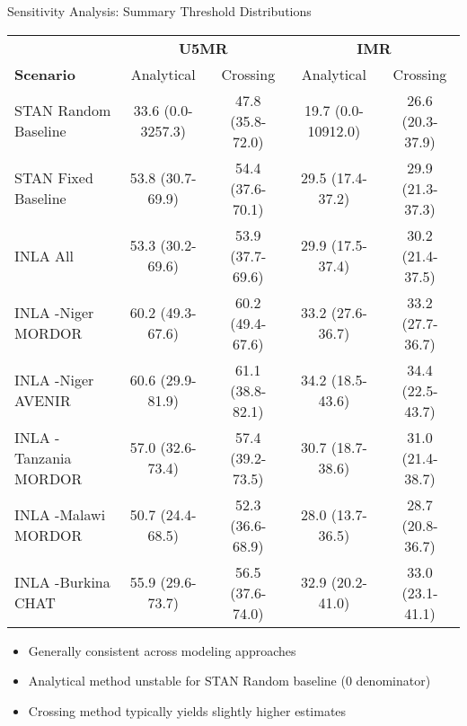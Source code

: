 \documentclass[aspectratio=169]{beamer}\usepackage[]{graphicx}\usepackage[dvipsnames]{xcolor}
\begin{document}
\begin{frame}{Sensitivity Analysis: Summary Threshold Distributions}
\begin{center}\footnotesize\begin{tabular}{l|cc|cc}\toprule& \multicolumn{2}{c}{\textbf{U5MR}} & \multicolumn{2}{c}{\textbf{IMR}} \\\textbf{Scenario} & Analytical & Crossing & Analytical & Crossing \\\midrule STAN Random Baseline & 33.6 (0.0-3257.3) & 47.8 (35.8-72.0) & 19.7 (0.0-10912.0) & 26.6 (20.3-37.9) \\STAN Fixed Baseline & 53.8 (30.7-69.9) & 54.4 (37.6-70.1) & 29.5 (17.4-37.2) & 29.9 (21.3-37.3) \\INLA All & 53.3 (30.2-69.6) & 53.9 (37.7-69.6) & 29.9 (17.5-37.4) & 30.2 (21.4-37.5) \\INLA -Niger MORDOR & 60.2 (49.3-67.6) & 60.2 (49.4-67.6) & 33.2 (27.6-36.7) & 33.2 (27.7-36.7) \\INLA -Niger AVENIR & 60.6 (29.9-81.9) & 61.1 (38.8-82.1) & 34.2 (18.5-43.6) & 34.4 (22.5-43.7) \\INLA -Tanzania MORDOR & 57.0 (32.6-73.4) & 57.4 (39.2-73.5) & 30.7 (18.7-38.6) & 31.0 (21.4-38.7) \\INLA -Malawi MORDOR & 50.7 (24.4-68.5) & 52.3 (36.6-68.9) & 28.0 (13.7-36.5) & 28.7 (20.8-36.7) \\INLA -Burkina CHAT & 55.9 (29.6-73.7) & 56.5 (37.6-74.0) & 32.9 (20.2-41.0) & 33.0 (23.1-41.1) \\\bottomrule\end{tabular}\end{center}

\vspace{0.3cm}
\begin{itemize}
  \item Generally consistent across modeling approaches
  \item Analytical method unstable for STAN Random baseline (0 denominator)
  \item Crossing method typically yields slightly higher estimates
\end{itemize}
\end{frame}
\end{document}
